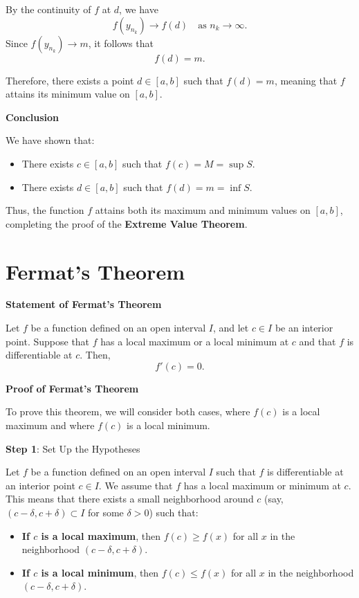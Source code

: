 \documentclass[a4paper,12pt]{book}
\begin{document}
By the continuity of \( f \) at \( d \), we have
\[
f(y_{n_k}) \to f(d) \quad \text{as } n_k \to \infty.
\]
Since \( f(y_{n_k}) \to m \), it follows that
\[
f(d) = m.
\]

Therefore, there exists a point \( d \in [a, b] \) such that \( f(d) = m \), meaning that \( f \) attains its minimum value on \([a, b]\).

\textbf{Conclusion}

We have shown that:

\begin{itemize}
	\item 
	There exists \( c \in [a, b] \) such that \( f(c) = M = \sup S \).
	\item 
	There exists \( d \in [a, b] \) such that \( f(d) = m = \inf S \).
\end{itemize}

Thus, the function \( f \) attains both its maximum and minimum values on \([a, b]\), completing the proof of the \textbf{Extreme Value Theorem}.

\section{Fermat's Theorem}

\textbf{Statement of Fermat's Theorem}

Let \( f \) be a function defined on an open interval \( I \), and let \( c \in I \) be an interior point. Suppose that \( f \) has a local maximum or a local minimum at \( c \) and that \( f \) is differentiable at \( c \). Then,
\[
f'(c) = 0.
\]

\textbf{Proof of Fermat's Theorem}

To prove this theorem, we will consider both cases, where \( f(c) \) is a local maximum and where \( f(c) \) is a local minimum.

\textbf{Step 1}: Set Up the Hypotheses

Let \( f \) be a function defined on an open interval \( I \) such that \( f \) is differentiable at an interior point \( c \in I \). We assume that \( f \) has a local maximum or minimum at \( c \). This means that there exists a small neighborhood around \( c \) (say, \( (c - \delta, c + \delta) \subset I \) for some \( \delta > 0 \)) such that:

\begin{itemize}
	\item 
	\textbf{If \( c \) is a local maximum}, then \( f(c) \geqslant f(x) \) for all \( x \) in the neighborhood \( (c - \delta, c + \delta) \).
	\item 
	\textbf{If \( c \) is a local minimum}, then \( f(c) \leqslant f(x) \) for all \( x \) in the neighborhood \( (c - \delta, c + \delta) \).
\end{itemize}
\end{document}
